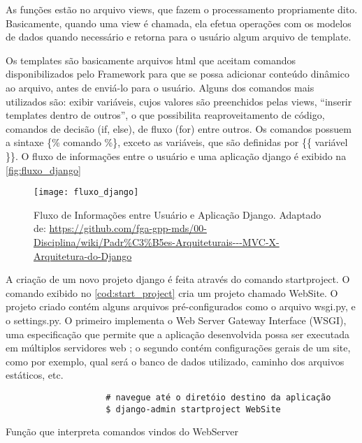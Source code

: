 				As funções estão no arquivo views, que fazem o processamento propriamente dito. Basicamente, quando uma view é chamada, ela efetua operações com os modelos de dados quando necessário e retorna para o usuário algum arquivo de template.
				
				Os templates são basicamente arquivos html que aceitam comandos disponibilizados pelo Framework para que se possa adicionar conteúdo dinâmico ao arquivo, antes de enviá-lo para o usuário. Alguns dos comandos mais utilizados são: exibir variáveis, cujos valores são preenchidos pelas views, ``inserir templates dentro de outros'', o que possibilita reaproveitamento de código, comandos de decisão (if, else), de fluxo (for) entre outros. Os comandos possuem a sintaxe  \{\% comando \%\}, exceto as variáveis, que são definidas por \{\{ variável \}\}. O fluxo de informações entre o usuário e uma aplicação django é exibido na \autoref{fig:fluxo_django}
				
				\begin{figure}[!htb]	
					\captionsetup{justification=centering}
					\begin{center}
						\texttt{[image: fluxo\_django]}  %
						\caption[Fluxo de Informações entre Usuário e Aplicação Django]{\label{fig:fluxo_django}Fluxo de Informações entre Usuário e Aplicação Django. Adaptado de: \url{https://github.com/fga-gpp-mds/00-Disciplina/wiki/Padr\%C3\%B5es-Arquiteturais---MVC-X-Arquitetura-do-Django}}
					\end{center}		
				\end{figure}
				
				A criação de um novo projeto django é feita através do comando startproject. O comando exibido no \autoref{cod:start_project} cria um projeto chamado WebSite. O projeto criado contém alguns arquivos pré-configurados como o arquivo wsgi.py, e o settings.py. O primeiro implementa o Web Server Gateway Interface (WSGI), uma especificação que permite que a aplicação desenvolvida possa ser executada em múltiplos servidores web \cite{klaus2012}; o segundo contém configurações gerais de um site, como por exemplo, qual será o banco de dados utilizado, caminho dos arquivos estáticos, etc.
								
				\begin{listing}[!htb]
					\begin{verbatim}
					# navegue até o diretóio destino da aplicação
					$ django-admin startproject WebSite
					\end{verbatim}
					\caption{Função que interpreta comandos vindos do WebServer}
					\label{cod:start_project}
				\end{listing}
			
